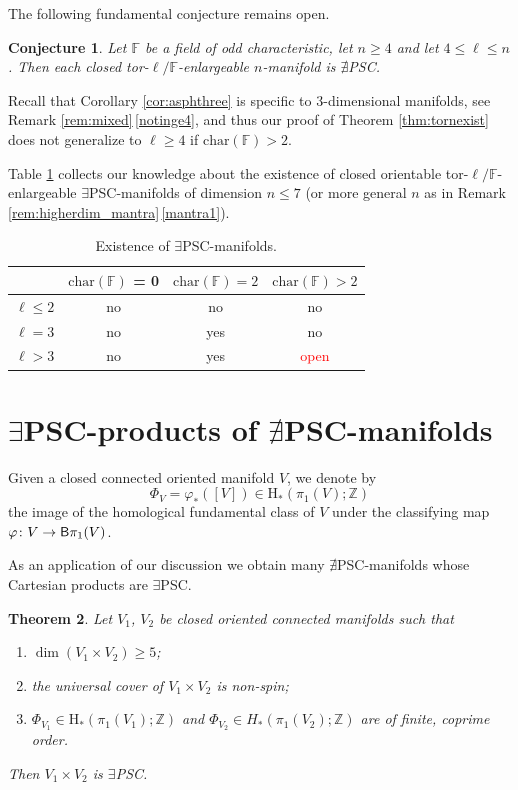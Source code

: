 \documentclass[10pt,a4paper]{amsart}
\numberwithin{equation}{section}
\newtheorem{Theorem}{Theorem}[section]
\newtheorem{Conjecture}[Theorem]{Conjecture}
 { \theoremstyle{definition}
\newtheorem{Definition}[Theorem]{Definition}
\newtheorem{Note}[Theorem]{Note}
\newtheorem{Example}[Theorem]{Example}
\newtheorem{Remark}[Theorem]{Remark}
}
\newcommand{\F}{\mathbb{F}}
\newcommand{\Z}{\mathbb{Z}}
\newcommand{\charac}{\mathrm{char}}
\newcommand{\sB}{{\sf B}}
\newcommand{\myicon}{$\,\,\,\triangleright$}
\newcommand{\no}{{\color{brown!70!black}$\nexists$}{\sf PSC}}
\newcommand{\yes}{{\color {blue!70!black}$\exists$}{\sf PSC}}
\newcommand{\Ho}{\mathrm{H}}
\begin{document}
The following fundamental conjecture remains open.

\begin{Conjecture} \label{main_conj}
Let $\F$ be a field of odd characteristic, let $n \geq 4$ and let $4 \leq \ell \leq n$.
Then each closed tor-$\ell/\mathbb F$-enlargeable $n$-manifold is \no.
\end{Conjecture}

Recall that Corollary \ref{cor:asphthree} is specific to $3$-dimensional manifolds, see Remark \ref{rem:mixed}\,\ref{notinge4}, and thus our proof of Theorem \ref{thm:tornexist} does not generalize to $\ell \geq 4$ if $\charac(\F) > 2$.

Table \ref{tab:conditions} collects our knowledge about the existence of closed orientable tor-$\ell / \F$-enlargeable \yes-manifolds of dimension $n \leq 7$ (or more general $n$ as in Remark \ref{rem:higherdim_mantra}\,\ref{mantra1}).

\begin{table}[h]\renewcommand{\arraystretch}{1.2}
\centering
\begin{tabular}{|c|c|c|c|}
\hline
 & $\charac(\F)$ = 0 & $\charac(\F) = 2$ & $\charac(\F) > 2$ \\
\hline
$\ell \leq 2$ & no & no & no \\
\hline
$\ell = 3$ & no & yes & no \\
\hline
$\ell > 3$ & no & yes & \textcolor{red}{open} \\
\hline
\end{tabular}

\caption{\label{tab:conditions}Existence of \yes-manifolds.}
\end{table}

\section[PSC-products]{\yes-products of \no-manifolds}

Given a closed connected oriented manifold $V$, we denote by
\[
 \Phi_{V} = \varphi_*([V]) \in \Ho_*( \pi_1(V);\Z)
\]
 the image of the homological fundamental class of $V$ under the classifying map $\varphi \colon V \to \sB \pi_1(V)$.


As an application of our discussion we obtain many \no-manifolds whose Cartesian products are \yes.

\begin{Theorem}\label{thm:plenty}
Let $V_1$, $V_2$ be closed oriented connected manifolds such that
\begin{enumerate}[\myicon]\itemsep=0pt
 \item $\dim (V_1 \times V_2) \geq 5$;
 \item the universal cover of $V_1 \times V_2$ is non-spin;
 \item $\Phi_{V_1} \in \Ho_*(\pi_1(V_1) ; \Z)$ and $\Phi_{V_2} \in H_*(\pi_1(V_2); \Z)$ are of finite, coprime order.
\end{enumerate}
Then $V_1 \times V_2$ is \yes.
\end{Theorem}
\end{document}
